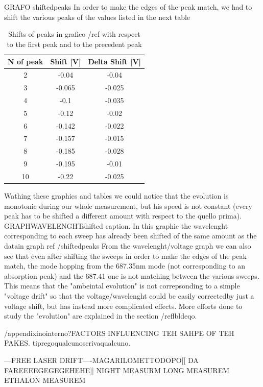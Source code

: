 GRAFO shiftedpeaks
In order to make the edges of the peak match, we had to shift the various peaks of the values listed in the next table
\begin{table}[htbp]
\begin{tabular}{|c|c|c|}
\hline
N of peak & Shift [V] & Delta Shift [V] \\ \hline
2 & -0.04 & -0.04 \\ \hline
3 & -0.065 & -0.025 \\ \hline
4 & -0.1 & -0.035 \\ \hline
5 & -0.12 & -0.02 \\ \hline
6 & -0.142 & -0.022 \\ \hline
7 & -0.157 & -0.015 \\ \hline
8 & -0.185 & -0.028 \\ \hline
9 & -0.195 & -0.01 \\ \hline
10 & -0.22 & -0.025 \\ \hline
\end{tabular}
\caption{Shifts of peaks in grafico /ref with respect to the first peak and to the precedent peak}
\label{peakshifts}
\end{table}

Wathing these graphics  and tables we could notice that the evolution is monotonic during our whole measurement, but his speed is not constant 
(every peak has to be shifted a different amount with respect to the quello prima).
GRAPHWAVELENGHTshifted
caption. In this graphic the wavelenght corresponding to each sweep has already been shifted of the same amount as the datain graph ref /shiftedpeaks
From the wavelenght/voltage graph we can also see that even after shifting the sweeps in order to make the edges of the peak match, the mode hopping from the 687.35nm 
mode (not corresponding to an absorption peak) and the 687.41 one is not matching between the various sweeps. This means that the "ambeintal evolution" is not 
correpsonding to a  simple "voltage drift" so that the voltage/wavelenght could be easily correctedby just a voltage shift, but has instead more complicated effects.
More efforts done to study the "evolution" are explained in the section /reflbldeqo.

/appendixinointerno?FACTORS INFLUENCING TEH SAHPE OF TEH PAKES.
tipregoqualcunoscrivaqualcuno.





---FREE LASER DRIFT----MAGARILOMETTODOPO[[  DA FAREEEEGEGEGEHEHE]]
NIGHT MEASURM
LONG MEASUREM
ETHALON MEASUREM

